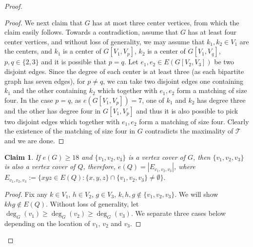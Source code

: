 \documentclass[11pt, reqno]{amsart}    	%
\newtheorem{claim}[thm]{Claim}
\theoremstyle{definition}
\def\cT{\mathcal T}
\numberwithin{equation}{section}
\begin{document}
\begin{proof}
\begin{proof}
			We next claim that $G$ has at most three center vertices, from which the claim easily follows. 
			Towards a contradiction, assume that $G$ has at least four center vertices, and without loss of generality, we may assume that $k_1,k_2 \in V_1$ are the centers, and $k_1$ is a center of $G[V_{1},V_{p}]$, $k_2$ is a center of $G[V_{1},V_{q}]$, $p,q\in \{2, 3\}$ and it is possible that $p=q$.
			Let $ e_1,e_2\in E(G[V_{2},V_{3}]) $ be two disjoint edges. 
			Since the degree of each center is at least three (as each bipartite graph has seven edges), for $p\neq q$, we can take two disjoint edges one containing $k_1$ and the other containing $k_2$ which together with $e_1, e_2$ form a matching of size four.
			In the case $p=q$, as  $e(G[V_{1},V_{p}])=7$, one of $k_1$ and $k_2$ has degree three and the other has degree four in  $G[V_{1},V_{p}]$ and thus it is also possible to pick two disjoint edges which together with $e_1, e_2$ form a matching of size four. 
			Clearly the existence of the matching of size four in $G$ contradicts the maximality of $\cT$ and we are done.
		\end{proof}	
		
		\begin{claim} \label{c2}
			If  $e(G)\ge18$ and $\{ v_{1},v_{2},v_{3}\}$ is a vertex  cover  of $G$, %
			then $\{ v_{1},v_{2},v_{3}\}$ is also a vertex  cover  of $Q$, therefore, $e(Q)=|E_{v_{1},v_{2},v_{3}}|$, where $E_{v_{1},v_{2},v_{3}} :=\{xyz\in E(Q):\{x,y,z\}\cap\{v_{1},v_{2},v_{3}\}\not= \emptyset\}.$
		\end{claim}	
		\begin{proof}
			Fix any $k\in V_1$, $h\in V_2$, $g\in V_3$, $k,h,g\notin \{ v_{1},v_{2},v_{3}\}$.  We will show $ khg\notin E(Q) $. 
			Without loss of generality, let $ \deg_{G}(v_{1})\ge \deg_{G}(v_{2}) \ge \deg_{G}(v_{3}) $. We separate three cases below depending on the location of $v_1$, $v_2$ and $v_3$.
			

\end{proof}
\end{proof}
\end{document}

